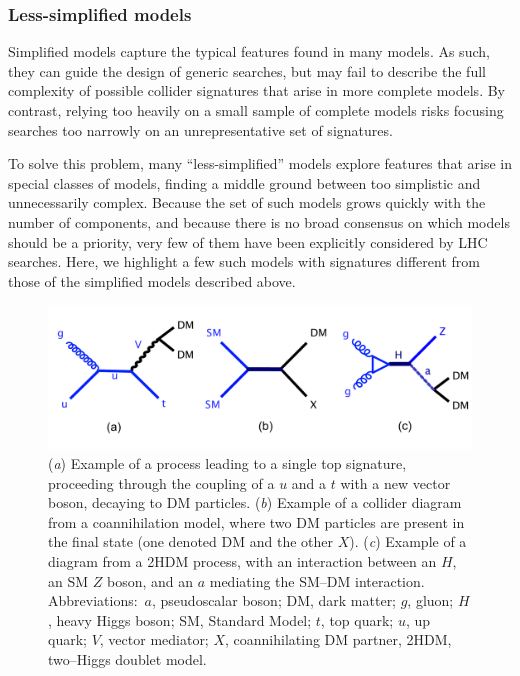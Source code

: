 \documentclass{ar-1col}
\begin{document}
{\subsubsection{Less-simplified models}\label{sec:LessSimplifiedModels}

Simplified models capture the typical features found in many models. 
As such, they can guide the design of generic searches, but may fail to describe
the full complexity of possible collider signatures that
arise in more complete models. By contrast, 
relying too heavily on a small sample of complete models risks focusing
searches too narrowly on an unrepresentative set of signatures.

To solve this problem, 
many ``less-simplified'' models explore features that arise in special classes of models, 
finding a middle ground between too
simplistic and unnecessarily complex. Because the
set of such models grows quickly with the number of components,
and because there is no broad consensus on which models should be a
priority, very few of them have been explicitly considered by LHC
searches. Here, we highlight a few such models with signatures different from those of
 the simplified models described above.

\begin{figure}[!htpb]
\includegraphics[width=\textwidth]{figures/feynman_2}
\caption{
(\textit{a}) Example of a process leading to a single top signature, proceeding through the coupling of a $u$ and a $t$ with a new vector boson, decaying to DM particles. 
(\textit{b}) Example of a collider diagram from a coannihilation model, where two DM particles are present in the final state (one denoted DM and the other  $X$). 
(\textit{c}) Example of a diagram from a 2HDM process, with an interaction between an  $H$, an SM $Z$ boson, and an $a$ mediating the SM--DM interaction. 
Abbreviations:\ $a$, pseudoscalar boson; DM, dark matter; $g$, gluon; $H$, heavy Higgs boson; SM, Standard Model; $t$, top quark;  $u$, up quark; $V$, vector mediator; $X$, coannihilating DM partner, 2HDM, two--Higgs doublet model.}
\label{fig:feynman_2}
\end{figure}

}
\end{document}
